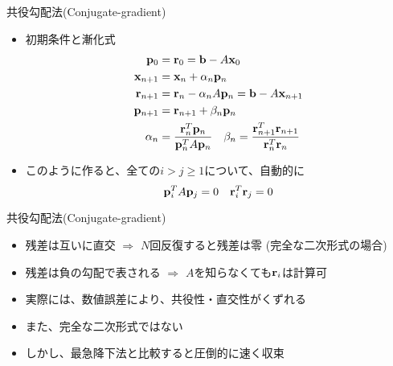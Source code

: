 \begin{frame}[t,fragile]{共役勾配法(Conjugate-gradient)}
  \begin{itemize}
    \setlength{\itemsep}{1em}
  \item 初期条件と漸化式
    \begin{align*}
      {\bf p}_0 &= {\bf r}_0 = {\bf b} - A {\bf x}_0 \\
      {\bf x}_{n+1} &= {\bf x}_n + \alpha_n {\bf p}_n \\
      {\bf r}_{n+1} &= {\bf r}_n - \alpha_n A {\bf p}_n = {\bf b} - A {\bf x}_{n+1} \\
      {\bf p}_{n+1} &= {\bf r}_{n+1} + \beta_n {\bf p}_n \\
      \alpha_n &= \frac{{\bf r}_n^T {\bf p}_n}{{\bf p}_n^T A {\bf p}_n} \ \ \
      \beta_n = \frac{{\bf r}_{n+1}^T {\bf r}_{n+1}}{{\bf r}_n^T {\bf r}_n}
    \end{align*}
  \item このように作ると、全ての$i>j \ge 1$について、自動的に
    \[
      {\bf p}_i^T A {\bf p}_j = 0 \ \ \ {\bf r}_i^T {\bf r}_j = 0
      \]
  \end{itemize}
\end{frame}

\begin{frame}[t,fragile]{共役勾配法(Conjugate-gradient)}
  \begin{itemize}
    \setlength{\itemsep}{1em}
  \item 残差は互いに直交 $\Rightarrow$ $N$回反復すると残差は零 (完全な二次形式の場合)
  \item 残差は負の勾配で表される $\Rightarrow$ $A$を知らなくても${\bf r}_i$は計算可
  \item 実際には、数値誤差により、共役性・直交性がくずれる
  \item また、完全な二次形式ではない
  \item しかし、最急降下法と比較すると圧倒的に速く収束
  \end{itemize}
\end{frame}

